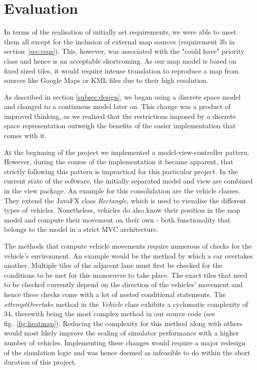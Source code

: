 \section{Evaluation}
\label{ss:eval_sim}
In terms of the realisation of initially set requirements, we were able to meet them all except for the inclusion of external map sources (requirement 3b in section~\ref{sec:reqs}). This, however, was associated with the "could have" priority class and hence is an acceptable shortcoming. As our map model is based on fixed sized tiles, it would require intense translation to reproduce a map from sources like Google Maps or KML files due to their high resolution. 

As described in section \ref{subsec:design}, we began using a discrete space model and changed to a continuous model later on. This change was a product of improved thinking, as we realised that the restrictions imposed by a discrete space representation outweigh the benefits of the easier implementation that comes with it.

At the beginning of the project we implemented a model-view-controller pattern. However, during the course of the implementation it became apparent, that strictly following this pattern is impractical for this particular project. In the current state of the software, the initially separated model and view are combined in the view package. An example for this consolidation are the vehicle classes. They extend the JavaFX class \textit{Rectangle}, which is used to visualise the different types of vehicles. Nonetheless, vehicles do also know their position in the map model and compute their movement on their own - both functionality that belongs to the model in a strict MVC architecture.

The methods that compute vehicle movements require numerous of checks for the vehicle's environment. An example would be the method by which a car overtakes another. Multiple tiles of the adjacent lane must first be checked for the conditions to be met for this manoeuvre to take place. The exact tiles that need to be checked currently depend on the direction of the vehicles' movement and hence these checks come with a lot of nested conditional statements. The \textit{attemptOvertake} method in the \textit{Vehicle} class exhibits a cyclomatic complexity of 34, therewith being the most complex method in our source code (see fig.~\ref{fig:heatmap}). Reducing the complexity for this method along with others would most likely improve the scaling of simulator performance with a higher number of vehicles. Implementing these changes would require a major redesign of the simulation logic and was hence deemed as infeasible to do within the short duration of this project.

